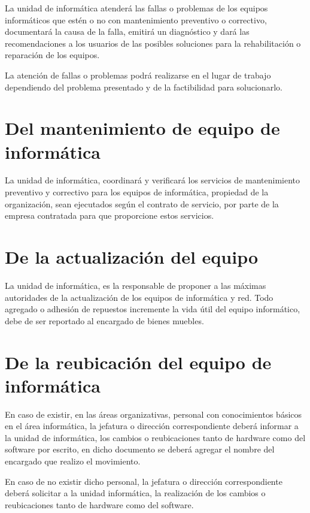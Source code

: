 \documentclass{book}
\begin{document}
            La unidad de informática atenderá las fallas o problemas de los equipos
            informáticos que estén o no con mantenimiento preventivo o correctivo, documentará la
            causa de la falla, emitirá un diagnóstico y dará las recomendaciones a los usuarios de las
            posibles soluciones para la rehabilitación o reparación de los equipos.

            La atención de fallas o problemas podrá realizarse en el lugar de trabajo
            dependiendo del problema presentado y de la factibilidad para solucionarlo.
        \

        \section{Del mantenimiento de equipo de informática}
            La unidad de informática, coordinará y verificará los servicios de
            mantenimiento preventivo y correctivo para los equipos de informática, propiedad de la
            organización, sean ejecutados según el contrato de servicio, por parte de
            la empresa contratada para que proporcione estos servicios.
        \

        \section{De la actualización del equipo}
            La unidad de informática, es la responsable de proponer a las máximas
            autoridades de la actualización de los equipos de informática y red.
            Todo agregado o adhesión de repuestos incremente la vida útil del equipo
            informático, debe de ser reportado al encargado de bienes muebles.
        \

        \section{De la reubicación del equipo de informática}
            En caso de existir, en las áreas organizativas, personal con conocimientos
            básicos en el área informática, la jefatura o dirección correspondiente deberá informar a
            la unidad de informática, los cambios o reubicaciones tanto de hardware como del
            software por escrito, en dicho documento se deberá agregar el nombre del encargado
            que realizo el movimiento.

            En caso de no existir dicho personal, la jefatura o dirección correspondiente
            deberá solicitar a la unidad informática, la realización de los cambios o reubicaciones
            tanto de hardware como del software.
\end{document}
